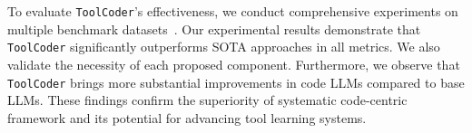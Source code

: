 
To evaluate \texttt{ToolCoder}'s effectiveness, we conduct comprehensive experiments on multiple benchmark datasets~\cite{DBLP:journals/corr/abs-2306-06624,li-etal-2023-api}. Our experimental results demonstrate that \texttt{ToolCoder} significantly outperforms SOTA approaches in all metrics. We also validate the necessity of each proposed component. Furthermore, we observe that \texttt{ToolCoder} brings more substantial improvements in code LLMs compared to base LLMs. These findings confirm the superiority of systematic code-centric framework and its potential for advancing tool learning systems.


